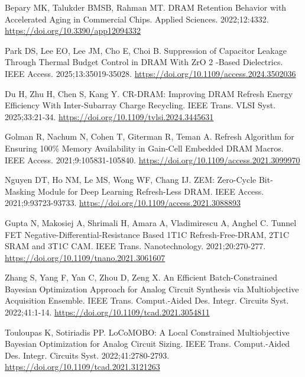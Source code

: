 Bepary MK, Talukder BMSB, Rahman MT. DRAM Retention Behavior with Accelerated Aging in Commercial Chips. Applied Sciences. 2022;12:4332.
\href{https://doi.org/10.3390/app12094332}{https://doi.org/10.3390/app12094332}

Park DS, Lee EO, Lee JM, Cho E, Choi B. Suppression of Capacitor Leakage Through Thermal Budget Control in DRAM With ZrO 2 -Based Dielectrics. IEEE Access. 2025;13:35019-35028.
\href{https://doi.org/10.1109/access.2024.3502036}{https://doi.org/10.1109/access.2024.3502036}

Du H, Zhu H, Chen S, Kang Y. CR-DRAM: Improving DRAM Refresh Energy Efficiency With Inter-Subarray Charge Recycling. IEEE Trans. VLSI Syst. 2025;33:21-34.
\href{https://doi.org/10.1109/tvlsi.2024.3445631}{https://doi.org/10.1109/tvlsi.2024.3445631}

Golman R, Nachum N, Cohen T, Giterman R, Teman A. Refresh Algorithm for Ensuring 100\% Memory Availability in Gain-Cell Embedded DRAM Macros. IEEE Access. 2021;9:105831-105840.
\href{https://doi.org/10.1109/access.2021.3099970}{https://doi.org/10.1109/access.2021.3099970}

Nguyen DT, Ho NM, Le MS, Wong WF, Chang IJ. ZEM: Zero-Cycle Bit-Masking Module for Deep Learning Refresh-Less DRAM. IEEE Access. 2021;9:93723-93733.
\href{https://doi.org/10.1109/access.2021.3088893}{https://doi.org/10.1109/access.2021.3088893}

Gupta N, Makosiej A, Shrimali H, Amara A, Vladimirescu A, Anghel C. Tunnel FET Negative-Differential-Resistance Based 1T1C Refresh-Free-DRAM, 2T1C SRAM and 3T1C CAM. IEEE Trans. Nanotechnology. 2021;20:270-277.
\href{https://doi.org/10.1109/tnano.2021.3061607}{https://doi.org/10.1109/tnano.2021.3061607}

Zhang S, Yang F, Yan C, Zhou D, Zeng X. An Efficient Batch-Constrained Bayesian Optimization Approach for Analog Circuit Synthesis via Multiobjective Acquisition Ensemble. IEEE Trans. Comput.-Aided Des. Integr. Circuits Syst. 2022;41:1-14.
\href{https://doi.org/10.1109/tcad.2021.3054811}{https://doi.org/10.1109/tcad.2021.3054811}

Touloupas K, Sotiriadis PP. LoCoMOBO: A Local Constrained Multiobjective Bayesian Optimization for Analog Circuit Sizing. IEEE Trans. Comput.-Aided Des. Integr. Circuits Syst. 2022;41:2780-2793.
\href{https://doi.org/10.1109/tcad.2021.3121263}{https://doi.org/10.1109/tcad.2021.3121263}

